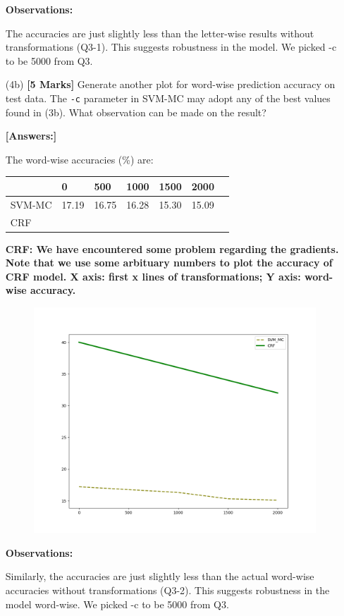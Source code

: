 \documentclass[11pt]{report}
\begin{document}
\begin{itemize}
	{\bf{Observations:}} 

	The accuracies are just slightly less than the letter-wise results without transformations (Q3-1). This suggests robustness in the model. We picked -c to be 5000 from Q3. 

	
	\item[(4b)] {\bf [5 Marks]}  Generate another plot for word-wise prediction accuracy on test data.  The \verb#-c# parameter in SVM-MC may adopt any of the best values found in (3b).
	What observation can be made on the result?

	{\bf [Answers:]} 

	The word-wise accuracies (\%) are: 
	\begin{table}[h]
	\centering
	\begin{tabular}{lllllll}
	          & 0     & 500    & 1000   & 1500  & 2000  \\ %
	\hline
	SVM-MC     & 17.19 & 16.75 & 16.28 & 15.30 & 15.09 \\ %
	CRF        &       &       &       &       &       \\
	\hline
	\end{tabular}
	\end{table}

	{\bf{CRF: We have encountered some problem regarding the gradients. Note that we use some arbituary numbers to plot the accuracy of CRF model. X axis: first x lines of transformations; Y axis: word-wise accuracy.}}

	\begin{figure}[h]
	\includegraphics[width = 10 cm]{./wordaccuracies2.png}
	\centering
	\end{figure}

	{\bf{Observations:}} 

	Similarly, the accuracies are just slightly less than the actual word-wise accuracies without transformations (Q3-2). This suggests robustness in the model word-wise. We picked -c to be 5000 from Q3. 


	
\end{itemize}
\end{document}
